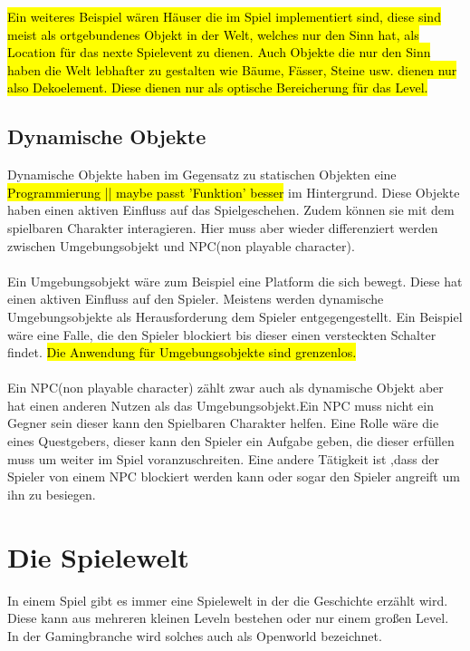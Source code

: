 \hl{
    Ein weiteres Beispiel wären Häuser die im Spiel implementiert sind, diese sind meist als ortgebundenes Objekt in der Welt, welches nur den Sinn hat, als Location für das nexte Spielevent zu dienen. Auch Objekte die nur den Sinn haben die Welt lebhafter zu gestalten wie Bäume, Fässer, Steine usw. dienen nur also Dekoelement. Diese dienen nur als optische Bereicherung für das Level. 
}

\subsection{Dynamische Objekte}
Dynamische Objekte haben im Gegensatz zu statischen Objekten eine \hl{Programmierung || maybe passt 'Funktion' besser} im Hintergrund. Diese Objekte haben einen aktiven Einfluss auf das Spielgeschehen. Zudem können sie mit dem spielbaren Charakter interagieren. Hier muss aber wieder differenziert werden zwischen Umgebungsobjekt und NPC(non playable character).\\\\ %
Ein Umgebungsobjekt wäre zum Beispiel eine Platform die sich bewegt. Diese hat einen aktiven Einfluss auf den Spieler. Meistens werden dynamische Umgebungsobjekte als Herausforderung dem Spieler entgegengestellt. Ein Beispiel wäre eine Falle, die den Spieler blockiert bis dieser einen versteckten Schalter findet. \hl{
    Die Anwendung für Umgebungsobjekte sind grenzenlos. %
}\\\\
Ein NPC(non playable character) zählt zwar auch als dynamische Objekt aber hat einen anderen Nutzen als das Umgebungsobjekt.Ein NPC muss nicht ein Gegner sein dieser kann den Spielbaren Charakter helfen. Eine Rolle wäre die eines Questgebers, dieser kann den Spieler ein Aufgabe geben, die dieser erfüllen muss um weiter im Spiel voranzuschreiten. Eine andere Tätigkeit ist ,dass der Spieler von einem NPC blockiert werden kann oder sogar den Spieler angreift um ihn zu besiegen.

\pagebreak

\section{Die Spielewelt}
In einem Spiel gibt es immer eine Spielewelt in der die Geschichte erzählt wird. Diese kann aus mehreren kleinen Leveln bestehen oder nur einem großen Level. In der Gamingbranche wird solches auch als Openworld bezeichnet.


